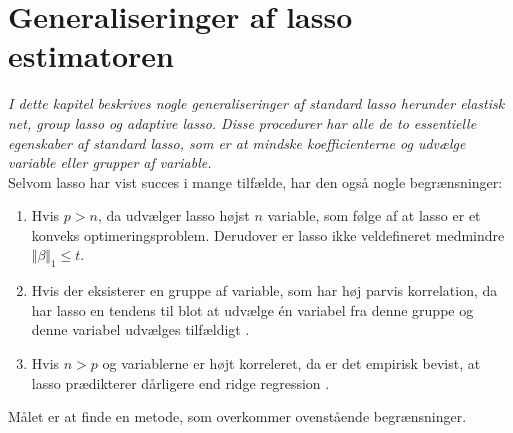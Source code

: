 \chapter{Generaliseringer af lasso estimatoren} \label{ch:generalisering_lasso}
\textit{I dette kapitel beskrives nogle generaliseringer af standard lasso herunder elastisk net, group lasso og adaptive lasso.
Disse procedurer har alle de to essentielle egenskaber af standard lasso, som er at mindske koefficienterne og udvælge variable eller grupper af variable.} \\[4mm]
%
Selvom lasso har vist succes i mange tilfælde, har den også nogle begrænsninger:
%
\begin{enumerate}[label=\textnormal{(\arabic*)}]
    \item Hvis $p>n$, da udvælger lasso højst $n$ variable, som følge af at lasso er et konveks optimeringsproblem. Derudover er lasso ikke veldefineret medmindre \(\Vert \beta \Vert_1 \leq t\). \label{itm:1}
    \item Hvis der eksisterer en gruppe af variable, som har høj parvis korrelation, da har lasso en tendens til blot at udvælge  én variabel fra denne gruppe og denne variabel udvælges tilfældigt \citep{zou_hastie}. \label{itm:2}
    \item Hvis $n>p$ og variablerne er højt korreleret, da er det empirisk bevist, at lasso prædikterer dårligere end ridge regression \citep{lasso}.  \label{itm:3}
\end{enumerate}

Målet er at finde en metode, som overkommer ovenstående begrænsninger.


